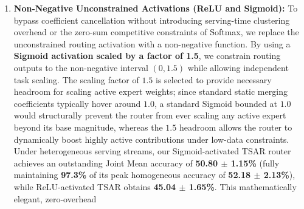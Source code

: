 \begin{enumerate}
sub-batches. We then dynamically merge parameters and execute forward passes independently for each
task-homogeneous cluster. This completely avoids mixed-task batch averaging, preserving our peak
homogeneous multi-task performance of \textbf{54.10\%} (since homogeneous batches are already
perfectly partitioned) at the cost of executing a few smaller, parallel forward passes. Empirically,
our online batch-partitioning TSAR router obtains a Heterogeneous Joint Mean of \textbf{40.58 $\pm$
2.63\%}; the slight reduction from the homogeneous ceiling is due to noisy K-Means clustering
boundaries over OOD samples, which occasionally group disjoint task representations together and
create minor cross-talk. Crucially, while this partitioning approach preserves homogeneous accuracy,
it introduces substantial wall-clock latency and serving-time computational overhead due to (i)
executing online K-Means clustering on the incoming batch, and (ii) running up to $K=4$ separate,
sequential or parallel forward passes over the dynamically merged models. This computational
bottleneck makes our non-negative Sigmoid activation the clearly superior and preferred choice for
production environments, as it bypasses heterogeneity collapse with mathematically elegant, absolute
zero runtime latency and serving overhead.
  \item \textbf{Non-Negative Unconstrained Activations (ReLU and Sigmoid):} To bypass coefficient
cancellation without introducing serving-time clustering overhead or the zero-sum competitive
constraints of Softmax, we replace the unconstrained routing activation with a non-negative
function. By using a \textbf{Sigmoid activation scaled by a factor of 1.5}, we constrain routing
outputs to the non-negative interval $(0, 1.5)$ while allowing independent task scaling. The scaling
factor of $1.5$ is selected to provide necessary headroom for scaling active expert weights; since
standard static merging coefficients typically hover around $1.0$, a standard Sigmoid bounded at
$1.0$ would structurally prevent the router from ever scaling any active expert beyond its base
magnitude, whereas the $1.5$ headroom allows the router to dynamically boost highly active
contributions under low-data constraints. Under heterogeneous serving streams, our Sigmoid-activated
TSAR router achieves an outstanding Joint Mean accuracy of \textbf{50.80 $\pm$ 1.15\%} (fully
maintaining \textbf{97.3\%} of its peak homogeneous accuracy of \textbf{52.18 $\pm$ 2.13\%}), while
ReLU-activated TSAR obtains \textbf{45.04 $\pm$ 1.65\%}. This mathematically elegant, zero-overhead

\end{enumerate}
